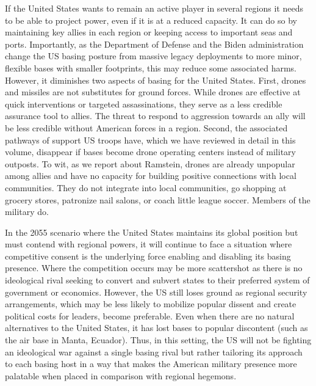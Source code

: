 If the United States wants to remain an active player in several regions it needs to be able to project power, even if it is at a reduced capacity. It can do so by maintaining key allies in each region or keeping access to important seas and ports. Importantly, as the Department of Defense and the Biden administration change the US basing posture from massive legacy deployments to more minor, flexible bases with smaller footprints, this may reduce some associated harms. However, it diminishes two aspects of basing for the United States. First, drones and missiles are not substitutes for ground forces. While drones are effective at quick interventions or targeted assassinations, they serve as a less credible assurance tool to allies.\cite{cypher2016,mehta2019} The threat to respond to aggression towards an ally will be less credible without American forces in a region. Second, the associated pathways of support US troops have, which we have reviewed in detail in this volume, disappear if bases become drone operating centers instead of military outposts. To wit, as we report about Ramstein, drones are already unpopular among allies and have no capacity for building positive connections with local communities. They do not integrate into local communities, go shopping at grocery stores, patronize nail salons, or coach little league soccer. Members of the military do.

In the 2055 scenario where the United States maintains its global position but must contend with regional powers, it will continue to face a situation where competitive consent is the underlying force enabling and disabling its basing presence. Where the competition occurs may be more scattershot as there is no ideological rival seeking to convert and subvert states to their preferred system of government or economics. However, the US still loses ground as regional security arrangements, which may be less likely to mobilize popular dissent and create political costs for leaders, become preferable. Even when there are no natural alternatives to the United States, it has lost bases to popular discontent (such as the air base in Manta, Ecuador). Thus, in this setting, the US will not be fighting an ideological war against a single basing rival but rather tailoring its approach to each basing host in a way that makes the American military presence more palatable when placed in comparison with regional hegemons. 


